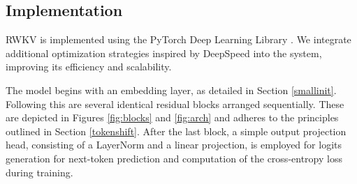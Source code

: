 \documentclass[11pt]{article}
\begin{document}
\subsection{Implementation}\label{detailed_implementation}

RWKV is implemented using the PyTorch Deep Learning Library \cite{paszke2019pytorch}. We integrate additional optimization strategies inspired by DeepSpeed \cite{10.1145/3394486.3406703} into the system, improving its efficiency and scalability.



The model begins with an embedding layer, as detailed in Section \ref{smallinit}. Following this are several identical residual blocks arranged sequentially. These are depicted in Figures \ref{fig:blocks} and \ref{fig:arch} and  adheres to the principles outlined in Section \ref{tokenshift}. After the last block, a simple output projection head, consisting of a LayerNorm \cite{ba2016layer} and a linear projection, is employed for logits generation for next-token prediction and  computation of the cross-entropy loss during training.


\end{document}
